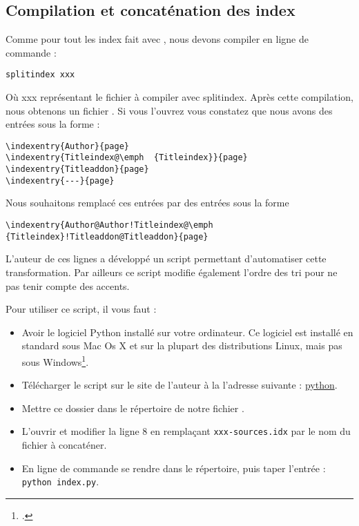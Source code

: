 \subsection{Compilation et concaténation des index}

Comme pour tout les index fait avec , nous devons compiler en ligne de commande :
\begin{verbatim}
splitindex xxx
\end{verbatim}

Où xxx représentant le fichier à compiler avec splitindex. Après cette compilation, nous obtenons un fichier . Si vous l'ouvrez vous constatez que nous avons des entrées sous la forme : 

\begin{verbatim}
\indexentry{Author}{page}
\indexentry{Titleindex@\emph  {Titleindex}}{page}
\indexentry{Titleaddon}{page}
\indexentry{---}{page}
\end{verbatim}

Nous souhaitons remplacé ces entrées par des entrées sous la forme 

\begin{verbatim}
\indexentry{Author@Author!Titleindex@\emph  {Titleindex}!Titleaddon@Titleaddon}{page}
\end{verbatim}

L'auteur de ces lignes a développé un script permettant d'automatiser cette transformation. Par ailleurs ce script modifie également l'ordre des tri pour ne pas tenir compte des accents.

Pour utiliser ce script, il vous faut :
\begin{itemize}
\item Avoir le logiciel Python installé sur votre ordinateur. Ce logiciel est installé en standard sous Mac Os X et sur la plupart des distributions Linux, mais pas sous Windows\footcite{python_windows}.
\item Télécharger le script sur le site de l'auteur à la l'adresse suivante : \url{python}.
\item Mettre ce dossier dans le répertoire de notre fichier . 
\item L'ouvrir et modifier la ligne 8 en remplaçant \verb|xxx-sources.idx| par le nom du fichier à concaténer.
\item En ligne de commande se rendre dans le  répertoire, puis taper l'entrée : \verb|python index.py|.
\end{itemize}


